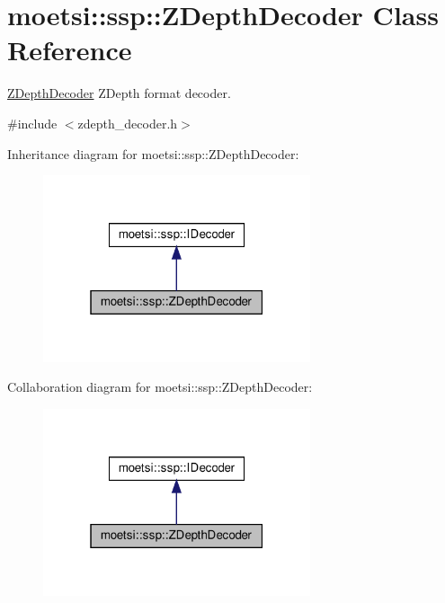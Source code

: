 \hypertarget{classmoetsi_1_1ssp_1_1ZDepthDecoder}{}\section{moetsi\+:\+:ssp\+:\+:Z\+Depth\+Decoder Class Reference}
\label{classmoetsi_1_1ssp_1_1ZDepthDecoder}


\hyperlink{classmoetsi_1_1ssp_1_1ZDepthDecoder}{Z\+Depth\+Decoder} Z\+Depth format decoder.  




{\ttfamily \#include $<$zdepth\+\_\+decoder.\+h$>$}



Inheritance diagram for moetsi\+:\+:ssp\+:\+:Z\+Depth\+Decoder\+:\nopagebreak
\begin{figure}[H]
\begin{center}
\leavevmode
\includegraphics[width=223pt]{classmoetsi_1_1ssp_1_1ZDepthDecoder__inherit__graph}
\end{center}
\end{figure}


Collaboration diagram for moetsi\+:\+:ssp\+:\+:Z\+Depth\+Decoder\+:\nopagebreak
\begin{figure}[H]
\begin{center}
\leavevmode
\includegraphics[width=223pt]{classmoetsi_1_1ssp_1_1ZDepthDecoder__coll__graph}
\end{center}
\end{figure}
